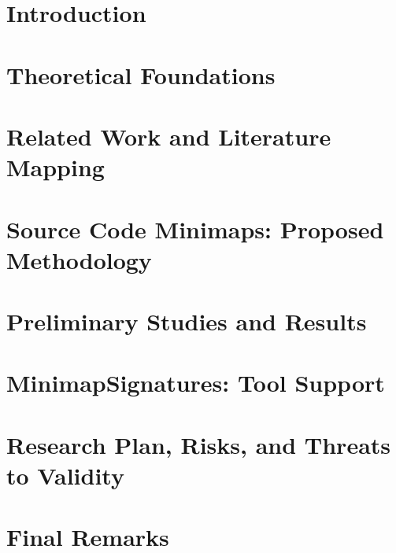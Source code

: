 \documentclass[qualificacao,doutorado]{packages/icmc}
\begin{document}
\textual

\chapter{Introduction}
\label{chapter:introduction}


\chapter{Theoretical Foundations}
\label{chapter:foundations}


\chapter{Related Work and Literature Mapping}
\label{chapter:related-work}


\chapter{Source Code Minimaps: Proposed Methodology}
\label{chapter:methodology}


\chapter{Preliminary Studies and Results}
\label{chapter:preliminary-results}


\chapter{MinimapSignatures: Tool Support}
\label{chapter:tool-support}


\chapter{Research Plan, Risks, and Threats to Validity}
\label{chapter:research-plan}


\chapter{Final Remarks}
\label{chapter:final-remarks}



\postextual
\end{document}
